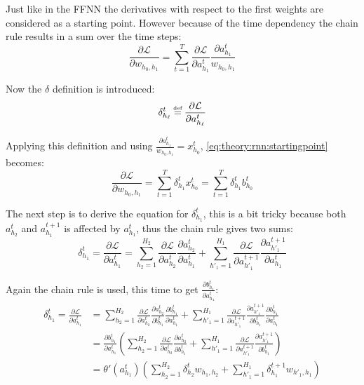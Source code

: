 Just like in the FFNN the derivatives with respect to the first weights are considered as a starting point. However because of the time dependency the chain rule results in a sum over the time steps:
\begin{equation}
\frac{\partial \mathcal{L}}{\partial w_{h_0, h_1}} = \sum_{t=1}^T \frac{\partial \mathcal{L}}{\partial a_{h_1}^t} \frac{\partial a_{h_1}^t}{w_{h_0, h_1}}
\label{eq:theory:rnn:startingpoint}
\end{equation}

Now the $\delta$ definition is introduced:
\begin{equation}
\delta_{h_\ell}^t \defeq \frac{\partial \mathcal{L}}{\partial a_{h_\ell}^t}
\end{equation}

Applying this definition and using $ \frac{\partial a_{h_1}^t}{w_{h_0, h_1}} = x_{h_0}^t$,  \eqref{eq:theory:rnn:startingpoint} becomes:
\begin{equation}
\frac{\partial \mathcal{L}}{\partial w_{h_0, h_1}} = \sum_{t=1}^T \delta_{h_1}^t x_{h_0}^t = \sum_{t=1}^T \delta_{h_1}^t b_{h_0}^t 
\end{equation}

The next step is to derive the equation for $\delta_{h_1}^t$, this is a bit tricky because both $a_{h_2}^t$ and $a_{h_1}^{t+1}$ is affected by $a_{h_1}^t$, thus the chain rule gives two sums:
\begin{equation}
\delta_{h_1}^t = \frac{\partial \mathcal{L}}{\partial a_{h_1}^t}
= \sum_{h_2 = 1}^{H_2} \frac{\partial \mathcal{L}}{\partial a_{h_2}^t} \frac{\partial a_{h_2}^t}{\partial a_{h_1}^t}
+ \sum_{h'_1 = 1}^{H_1} \frac{\partial \mathcal{L}}{\partial a_{h'_1}^{t+1}} \frac{\partial a_{h'_1}^{t+1}}{\partial a_{h_1}^t}
\end{equation}

Again the chain rule is used, this time to get $\frac{\partial b_{h_1}^t}{\partial a_{h_1}^t}$:
\begin{equation}
\begin{aligned}
\delta_{h_1}^t = \frac{\partial \mathcal{L}}{\partial a_{h_1}^t}
&= \sum_{h_2 = 1}^{H_2} \frac{\partial \mathcal{L}}{\partial a_{h_2}^t} \frac{\partial a_{h_2}^t}{\partial b_{h_1}^t} \frac{\partial b_{h_1}^t}{\partial a_{h_1}^t}
+ \sum_{h'_1 = 1}^{H_1} \frac{\partial \mathcal{L}}{\partial a_{h'_1}^{t+1}} \frac{\partial a_{h'_1}^{t+1}}{\partial b_{h_1}^t} \frac{\partial b_{h_1}^t}{\partial a_{h_1}^t} \\
&= \frac{\partial b_{h_1}^t}{\partial a_{h_1}^t} \left(\sum_{h_2 = 1}^{H_2} \frac{\partial \mathcal{L}}{\partial a_{h_2}^t} \frac{\partial a_{h_2}^t}{\partial b_{h_1}^t}
+ \sum_{h'_1 = 1}^{H_1} \frac{\partial \mathcal{L}}{\partial a_{h'_1}^{t+1}} \frac{\partial a_{h'_1}^{t+1}}{\partial b_{h_1}^t} \right) \\
&= \theta'(a_{h_1}^t) \left( \sum_{h_2=1}^{H_2} \delta_{h_2}^t w_{h_1, h_2}
+ \sum_{h'_1=1}^{H_1} \delta_{h_1}^{t+1} w_{h'_1, h_1} \right)
\label{eq:theory:rnn:bprop-delta1}
\end{aligned}
\end{equation}

